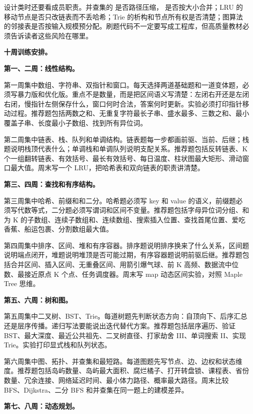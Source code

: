 设计类时还要看成员职责。并查集的  是否路径压缩， 是否按大小合并；LRU 的移动节点是否只改链表而不丢哈希；Trie 的析构和节点所有权是否清楚；图算法的邻接表是否按输入规模预分配。刷题代码不一定要写成工程库，但高质量教材必须告诉读者这些风险在哪里。

\noindent\textbf{十周训练安排。}

\noindent\textbf{第一、二周：线性结构。}

第一周集中数组、字符串、双指针和窗口。每天选择两道基础题和一道变体题，必须写暴力版和优化版。重点不是数量，而是把区间语义写清楚：左闭右开还是左闭右闭，慢指针左侧保存什么，窗口何时合法，答案何时更新。实验必须打印指针移动过程。推荐题包括两数之和、无重复字符最长子串、盛水最多、三数之和、最小覆盖子串、长度最小子数组、找到所有异位词。

第二周集中链表、栈、队列和单调结构。链表题每一步都画前驱、当前、后继；栈题说明栈顶代表什么；单调栈和单调队列说明支配关系。推荐题包括反转链表、K 个一组翻转链表、有效括号、最长有效括号、每日温度、柱状图最大矩形、滑动窗口最大值。周末写一个 LRU，把哈希表和双向链表的职责讲清楚。

\noindent\textbf{第三、四周：查找和有序结构。}

第三周集中哈希、前缀和和二分。哈希题必须写 key 和 value 的语义，前缀题必须写代数等式，二分题必须写谓词和区间不变量。推荐题包括字母异位词分组、和为 K 的子数组、连续子数组和、连续数组、搜索插入位置、查找首尾位置、爱吃香蕉、船运包裹、分割数组最大值。

第四周集中排序、区间、堆和有序容器。排序题说明排序换来了什么关系，区间题说明端点闭开，堆题说明堆顶是否可能过期，有序容器题说明前驱后继。推荐题包括合并区间、插入区间、无重叠区间、用箭引爆气球、前 K 高频、数据流中位数、最接近原点 K 个点、任务调度器。周末写 map 动态区间实验，对照 Maple Tree 思维。

\noindent\textbf{第五、六周：树和图。}

第五周集中二叉树、BST、Trie。每道树题先判断状态方向：自顶向下、后序汇总还是层序传播。递归写法要能说出迭代替代方案。推荐题包括层序遍历、验证 BST、最大深度、最近公共祖先、二叉树直径、打家劫舍 III、单词搜索 II、实现 Trie。实验打印显式栈和队列状态。

第六周集中图、拓扑、并查集和最短路。每道图题先写节点、边、边权和状态维度。推荐题包括岛屿数量、岛屿最大面积、腐烂橘子、打开转盘锁、课程表、省份数量、冗余连接、网络延迟时间、最小体力路径、概率最大路径。周末比较 BFS、Dijkstra、二分 BFS 和并查集在同一题上的建模差异。

\noindent\textbf{第七、八周：动态规划。}

